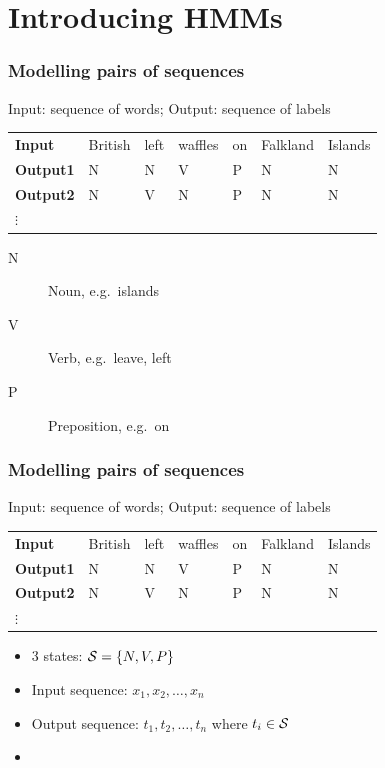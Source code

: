 \section{Introducing HMMs}

\begin{frame}
\frametitle{Modelling pairs of sequences}
\begin{block}{Input: sequence of words; Output: sequence of labels}
\begin{tabular}{lllllll}
\textbf{Input} & British & left & waffles & on & Falkland & Islands \pause \\
\textbf{Output1} & N & N & V & P & N & N \\
\textbf{Output2} & N & V & N & P & N & N \\
$\vdots$ & & & & & & 
\end{tabular}

\begin{description}
\item[N] Noun, e.g.\ islands
\item[V] Verb, e.g.\ leave, left
\item[P] Preposition, e.g.\ on
\end{description}
\end{block}
\end{frame}

\begin{frame}
\frametitle{Modelling pairs of sequences}
\begin{block}{Input: sequence of words; Output: sequence of labels}
\begin{tabular}{lllllll}
\textbf{Input} & British & left & waffles & on & Falkland & Islands \pause \\
\textbf{Output1} & N & N & V & P & N & N \\
\textbf{Output2} & N & V & N & P & N & N \\
$\vdots$ & & & & & & 
\end{tabular}
\end{block}

\pause
\begin{block}{}
\begin{itemize}
\item 3 states: ${\cal S} = \{ N, V, P \}$
\item Input sequence: $x_1, x_2, \ldots, x_n$
\item Output sequence: $t_1, t_2, \ldots, t_n$ where $t_i \in {\cal S}$
\item {}
\end{itemize}
\end{block}
\end{frame}

